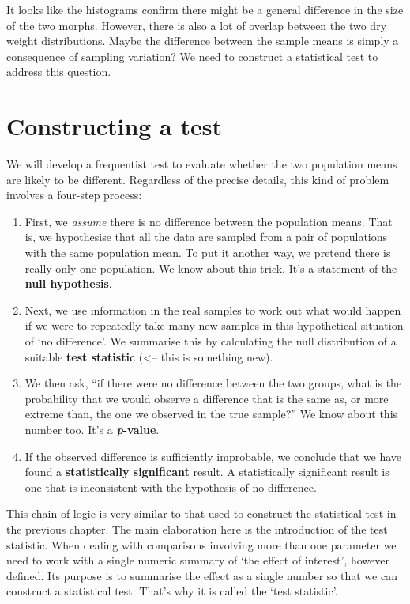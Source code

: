 \documentclass[
]{book}
\begin{document}
It looks like the histograms confirm there might be a general difference in the size of the two morphs. However, there is also a lot of overlap between the two dry weight distributions. Maybe the difference between the sample means is simply a consequence of sampling variation? We need to construct a statistical test to address this question.

\hypertarget{constructing-a-test}{%
\section{Constructing a test}\label{constructing-a-test}}

We will develop a frequentist test to evaluate whether the two population means are likely to be different. Regardless of the precise details, this kind of problem involves a four-step process:

\begin{enumerate}
\def\labelenumi{\arabic{enumi}.}
\item
  First, we \emph{assume} there is no difference between the population means. That is, we hypothesise that all the data are sampled from a pair of populations with the same population mean. To put it another way, we pretend there is really only one population. We know about this trick. It's a statement of the \textbf{null hypothesis}.
\item
  Next, we use information in the real samples to work out what would happen if we were to repeatedly take many new samples in this hypothetical situation of `no difference'. We summarise this by calculating the null distribution of a suitable \textbf{test statistic} (\textless-- this is something new).
\item
  We then ask, ``if there were no difference between the two groups, what is the probability that we would observe a difference that is the same as, or more extreme than, the one we observed in the true sample?'' We know about this number too. It's a \textbf{\emph{p}-value}.
\item
  If the observed difference is sufficiently improbable, we conclude that we have found a \textbf{statistically significant} result. A statistically significant result is one that is inconsistent with the hypothesis of no difference.
\end{enumerate}

This chain of logic is very similar to that used to construct the statistical test in the previous chapter. The main elaboration here is the introduction of the test statistic. When dealing with comparisons involving more than one parameter we need to work with a single numeric summary of `the effect of interest', however defined. Its purpose is to summarise the effect as a single number so that we can construct a statistical test. That's why it is called the `test statistic'.
\end{document}
